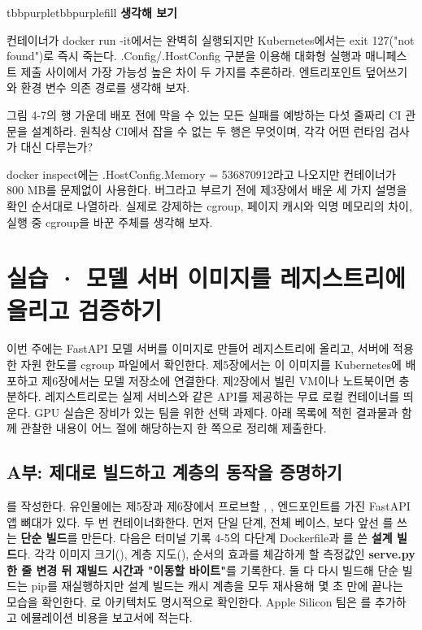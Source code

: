 \begin{calloutbox}{tbbpurple}{tbbpurplefill}
{\normalsize\bfseries\color{tbbpurple}생각해 보기}\par\vspace{3pt}
\begin{tbbitemize}
  \item 컨테이너가 docker run -it에서는 완벽히 실행되지만 Kubernetes에서는 exit 127("not found")로 즉시 죽는다. .Config/.HostConfig 구분을 이용해 대화형 실행과 매니페스트 제출 사이에서 가장 가능성 높은 차이 두 가지를 추론하라. 엔트리포인트 덮어쓰기와 환경 변수 의존 경로를 생각해 보자.
  \item 그림 4-7의 행 가운데 배포 전에 막을 수 있는 모든 실패를 예방하는 다섯 줄짜리 CI 관문을 설계하라. 원칙상 CI에서 잡을 수 없는 두 행은 무엇이며, 각각 어떤 런타임 검사가 대신 다루는가?
  \item docker inspect에는 .HostConfig.Memory = 536870912라고 나오지만 컨테이너가 800 MB를 문제없이 사용한다. 버그라고 부르기 전에 제3장에서 배운 세 가지 설명을 확인 순서대로 나열하라. 실제로 강제하는 cgroup, 페이지 캐시와 익명 메모리의 차이, 실행 중 cgroup을 바꾼 주체를 생각해 보자.
\end{tbbitemize}
\end{calloutbox}

\section{실습 · 모델 서버 이미지를 레지스트리에 올리고 검증하기}

이번 주에는 FastAPI 모델 서버를 이미지로 만들어 레지스트리에 올리고, 서버에 적용한 자원 한도를 cgroup 파일에서 확인한다. 제5장에서는 이 이미지를 Kubernetes에 배포하고 제6장에서는 모델 저장소에 연결한다. 제2장에서 빌린 VM이나 노트북이면 충분하다. 레지스트리로는 실제 서비스와 같은 API를 제공하는 무료 로컬  컨테이너를 띄운다. GPU 실습은 장비가 있는 팀을 위한 선택 과제다. 아래 목록에 적힌 결과물과 함께 관찰한 내용이 어느 절에 해당하는지 한 쪽으로 정리해 제출한다.

\subsection*{A부: 제대로 빌드하고 계층의 동작을 증명하기}

를 작성한다. 유인물에는 제5장과 제6장에서 프로브할 , ,  엔드포인트를 가진 FastAPI 앱 뼈대가 있다. 두 번 컨테이너화한다. 먼저 단일 단계, 전체 베이스, 보다 앞선 를 쓰는 \textbf{단순 빌드}를 만든다. 다음은 터미널 기록 4-5의 다단계 Dockerfile과 를 쓴 \textbf{설계 빌드}다. 각각 이미지 크기(), 계층 지도(), 순서의 효과를 체감하게 할 측정값인 \textbf{serve.py 한 줄 변경 뒤 재빌드 시간과 "이동할 바이트"}를 기록한다. 둘 다 다시 빌드해 단순 빌드는 pip를 재실행하지만 설계 빌드는 캐시 계층을 모두 재사용해 몇 초 만에 끝나는 모습을 확인한다. 로 아키텍처도 명시적으로 확인한다. Apple Silicon 팀은 를 추가하고 에뮬레이션 비용을 보고서에 적는다.

